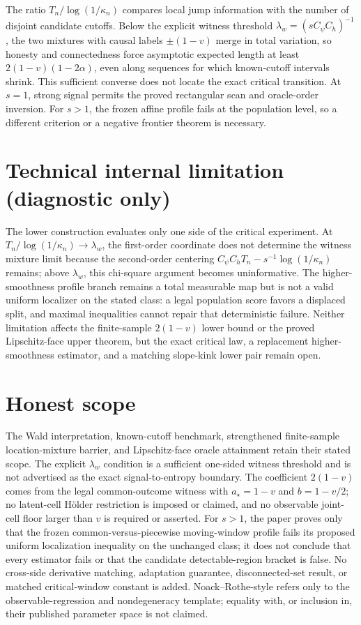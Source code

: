 \documentclass{article}
\begin{document}
The ratio \(T_n/\log(1/\kappa_n)\) compares local jump information with the number of disjoint candidate cutoffs.  Below the explicit witness threshold \(\lambda_w=(sC_\psi C_h)^{-1}\), the two mixtures with causal labels \(\pm(1-v)\) merge in total variation, so honesty and connectedness force asymptotic expected length at least \(2(1-v)(1-2\alpha)\), even along sequences for which known-cutoff intervals shrink.  This sufficient converse does not locate the exact critical transition.  At \(s=1\), strong signal permits the proved rectangular scan and oracle-order inversion.  For \(s>1\), the frozen affine profile fails at the population level, so a different criterion or a negative frontier theorem is necessary.

\section*{Technical internal limitation (diagnostic only)}

The lower construction evaluates only one side of the critical experiment.  At \(T_n/\log(1/\kappa_n)\to\lambda_w\), the first-order coordinate does not determine the witness mixture limit because the second-order centering \(C_\psi C_hT_n-s^{-1}\log(1/\kappa_n)\) remains; above \(\lambda_w\), this chi-square argument becomes uninformative.  The higher-smoothness profile branch remains a total measurable map but is not a valid uniform localizer on the stated class: a legal population score favors a displaced split, and maximal inequalities cannot repair that deterministic failure.  Neither limitation affects the finite-sample \(2(1-v)\) lower bound or the proved Lipschitz-face upper theorem, but the exact critical law, a replacement higher-smoothness estimator, and a matching slope-kink lower pair remain open.

\section{Honest scope}

The Wald interpretation, known-cutoff benchmark, strengthened finite-sample location-mixture barrier, and Lipschitz-face oracle attainment retain their stated scope.  The explicit \(\lambda_w\) condition is a sufficient one-sided witness threshold and is not advertised as the exact signal-to-entropy boundary.  The coefficient \(2(1-v)\) comes from the legal common-outcome witness with \(a_\star=1-v\) and \(b=1-v/2\); no latent-cell H{\"o}lder restriction is imposed or claimed, and no observable joint-cell floor larger than \(v\) is required or asserted.  For \(s>1\), the paper proves only that the frozen common-versus-piecewise moving-window profile fails its proposed uniform localization inequality on the unchanged class; it does not conclude that every estimator fails or that the candidate detectable-region bracket is false.  No cross-side derivative matching, adaptation guarantee, disconnected-set result, or matched critical-window constant is added.  Noack--Rothe-style refers only to the observable-regression and nondegeneracy template; equality with, or inclusion in, their published parameter space is not claimed.
\end{document}
